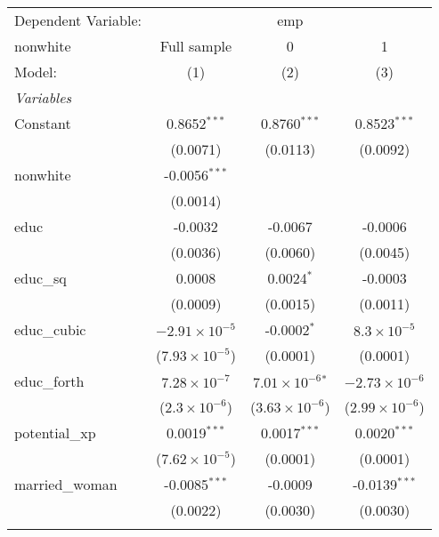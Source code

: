 
\begingroup
\centering
\begin{tabular}{lccc}
   \tabularnewline \midrule \midrule
   Dependent Variable: & \multicolumn{3}{c}{emp}\\
   nonwhite        & Full sample             & 0                           & 1 \\   
   Model:          & (1)                     & (2)                         & (3)\\  
   \midrule
   \emph{Variables}\\
   Constant        & 0.8652$^{***}$          & 0.8760$^{***}$              & 0.8523$^{***}$\\   
                   & (0.0071)                & (0.0113)                    & (0.0092)\\   
   nonwhite        & -0.0056$^{***}$         &                             &   \\   
                   & (0.0014)                &                             &   \\   
   educ            & -0.0032                 & -0.0067                     & -0.0006\\   
                   & (0.0036)                & (0.0060)                    & (0.0045)\\   
   educ\_sq        & 0.0008                  & 0.0024$^{*}$                & -0.0003\\   
                   & (0.0009)                & (0.0015)                    & (0.0011)\\   
   educ\_cubic     & $-2.91\times 10^{-5}$   & -0.0002$^{*}$               & $8.3\times 10^{-5}$\\    
                   & ($7.93\times 10^{-5}$)  & (0.0001)                    & (0.0001)\\   
   educ\_forth     & $7.28\times 10^{-7}$    & $7.01\times 10^{-6}$$^{*}$  & $-2.73\times 10^{-6}$\\    
                   & ($2.3\times 10^{-6}$)   & ($3.63\times 10^{-6}$)      & ($2.99\times 10^{-6}$)\\    
   potential\_xp   & 0.0019$^{***}$          & 0.0017$^{***}$              & 0.0020$^{***}$\\   
                   & ($7.62\times 10^{-5}$)  & (0.0001)                    & (0.0001)\\   
   married\_woman  & -0.0085$^{***}$         & -0.0009                     & -0.0139$^{***}$\\   
                   & (0.0022)                & (0.0030)                    & (0.0030)\\   
$$
\end{tabular}
